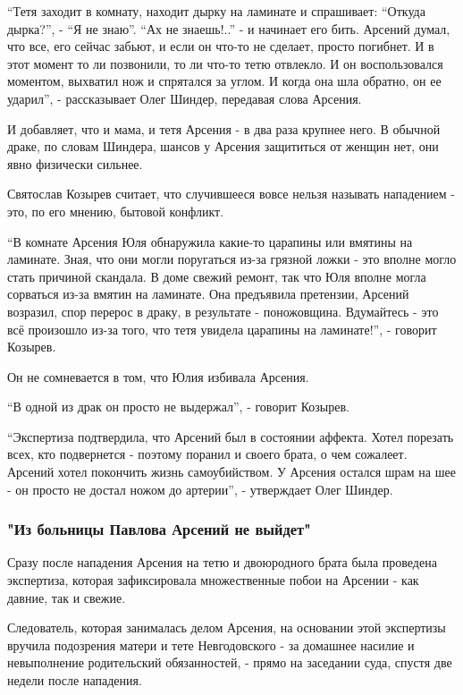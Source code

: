 “Тетя заходит в комнату, находит дырку на ламинате и спрашивает: “Откуда
дырка?”, - “Я не знаю”. “Ах не знаешь!..” - и начинает его бить. Арсений думал,
что все, его сейчас забьют, и если он что-то не сделает, просто погибнет. И в
этот момент то ли позвонили, то ли что-то тетю отвлекло. И он воспользовался
моментом, выхватил нож и спрятался за углом. И когда она шла обратно, он ее
ударил”, - рассказывает Олег Шиндер, передавая слова Арсения. 

И добавляет, что и мама, и тетя Арсения - в два раза крупнее него. В обычной
драке, по словам Шиндера, шансов у Арсения защититься от женщин нет, они явно
физически сильнее. 

Святослав Козырев считает, что случившееся вовсе нельзя называть нападением -
это, по его мнению, бытовой конфликт. 

“В комнате Арсения Юля обнаружила какие-то царапины или вмятины на ламинате.
Зная, что они могли поругаться из-за грязной ложки - это вполне могло стать
причиной скандала. В доме свежий ремонт, так что Юля вполне могла сорваться
из-за вмятин на ламинате. Она предъявила претензии, Арсений возразил, спор
перерос в драку, в результате - поножовщина. Вдумайтесь - это всё произошло
из-за того, что тетя увидела царапины на ламинате!”, - говорит Козырев.  

Он не сомневается в том, что Юлия избивала Арсения.

“В одной из драк он просто не выдержал”, - говорит Козырев. 

“Экспертиза подтвердила, что Арсений был в состоянии аффекта. Хотел порезать
всех, кто подвернется - поэтому поранил и своего брата, о чем сожалеет. Арсений
хотел покончить жизнь самоубийством. У Арсения остался шрам на шее - он просто
не достал ножом до артерии”, - утверждает Олег Шиндер. 

\subsubsection{"Из больницы Павлова Арсений не выйдет"}

Сразу после нападения Арсения на тетю и двоюродного брата была проведена
экспертиза, которая зафиксировала множественные побои на Арсении - как давние,
так и свежие. 

Следователь, которая занималась делом Арсения, на основании этой экспертизы
вручила подозрения матери и тете Невгодовского - за домашнее насилие и
невыполнение родительский обязанностей, - прямо на заседании суда, спустя две
недели после нападения.

